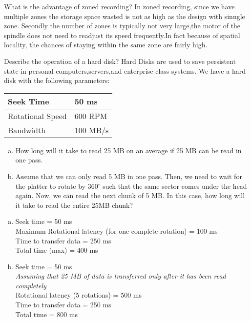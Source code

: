 \begin{ExerciseList} 

\Exercise
What is the advantage of zoned recording?
\Answer 
In zoned recording, since we have multiple zones the storage space wasted is not as high as the design with sinngle zone. Secondly the number of zones is typically not very large,the motor of the spindle does not need to readjust its speed frequently.In fact because of spatial locality, the chances of staying within the same zone are fairly high.

\Exercise
Describe the operation of a hard disk?
\Answer
Hard Disks are used to save persistent state in personal computers,servers,and enterprise class systems.
\Exercise
We have a hard disk with the following parameters: 

\vskip 5mm

\begin{center}
\begin{tabular}{|l|l|}
\hline
Seek Time & 50 ms \\
\hline
Rotational Speed & 600 RPM \\
\hline
Bandwidth & 100 MB/s \\
\hline

\end{tabular} 
\end{center}

\vskip 5mm

\begin{enumerate}[(a) ]
\item How long will it take to read 25 MB on an average if 25 MB can be read in one pass. 
\item Assume that we can only read 5 MB in one pass. Then, we need to wait for the platter to rotate by 360$^\circ$
such that the same sector comes under the head again. Now, we can read the next chunk of 5 MB. In this case,
how long will it take to read the entire 25MB chunk? 
\end{enumerate}

\Answer
\begin{enumerate}[(a) ]
\item Seek time = 50 ms\\
Maximum Rotational latency (for one complete rotation) = 100 ms \\
Time to transfer data = 250 ms\\
Total time (max) = 400 ms

\item	Seek time = 50 ms \\
\emph{Assuming that 25 MB of data is transferred only after it has been read completely}\\
Rotational latency (5 rotations) = 500 ms \\
Time to transfer data = 250 ms \\
Total time = 800 ms
\end{enumerate}


\end{ExerciseList}
